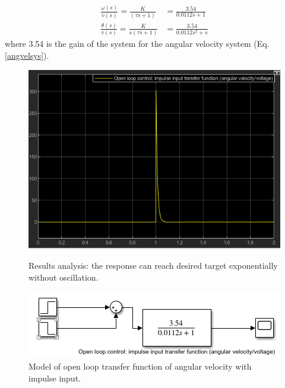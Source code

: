 \documentclass[conference]{IEEEtran}
\begin{document}
\begin{align}
    \frac{\omega (s)}{v(s)} = \frac{K}{(\tau s +1)} &= \frac{3.54}{0.0112s + 1} \label{angvelsys}\\
    \frac{\theta (s)}{v(s)} = \frac{K}{s(\tau s + 1)} &= \frac{3.54}{0.0112s^2 + s}
\end{align}
where 3.54 is the gain of the system for the angular velocity system (Eq.\ref{angvelsys}).
\begin{figure}[htbp]
    \centering
    \begin{minipage}[b]{0.24\textwidth}
        \includegraphics[width=\textwidth]{./Graph/G1.png}
        \caption{Results analysis: the response can reach desired target exponentially without oscillation.}
    \end{minipage}
    \hfill
    \begin{minipage}[b]{0.24\textwidth}
        \centering
        \includegraphics[width=\textwidth]{./Graph/Graph1.png}
        \caption{Model of open loop transfer function of angular velocity with impulse input.}
    \end{minipage}
\end{figure}
\end{document}
